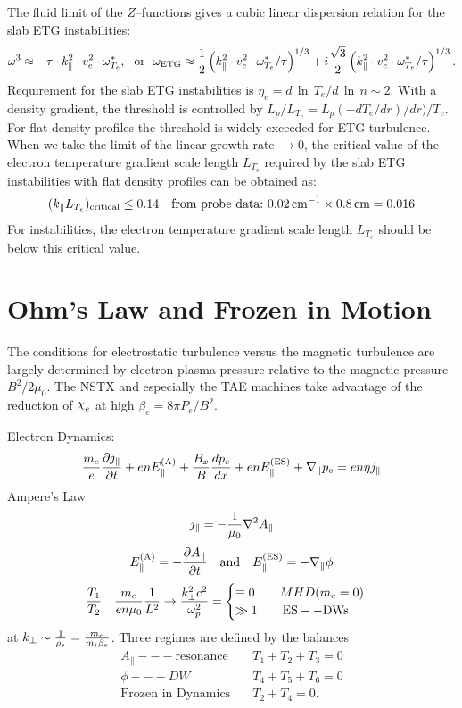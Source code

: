 \documentclass[a4paper,openany,12pt]{book}
\def\chix{\raise.5ex\hbox{$\chi$}}
\begin{document}
The fluid limit of the $Z$--functions gives a cubic linear dispersion relation for the slab ETG instabilities: 
$$\omega^3\approx-\tau\cdot k^2_\|\cdot v_e^2\cdot\omega^*_{T_e},\ \ {\rm or}\ \ \omega_{\rm ETG}\approx{1\over 2}\left(k^2_\|\cdot v^2_e\cdot\omega^*_{T_e}/\tau\right)^{1/3}+i{\sqrt 3\over 2}\left(k^2_\|\cdot v^2_e\cdot\omega^*_{T_e}/\tau\right)^{1/3}.$$
Requirement for the slab ETG instabilities is $\eta_e=d\,\ln\, T_e/d\,\ln\, n\sim 2$.
With a density gradient, the threshold is controlled by $L_p/L_{T_e}=L_p(-dT_e/dr)/dr)/T_e$.
For flat density profiles the threshold is widely exceeded for ETG turbulence.\\
 
When we take the limit of the linear growth rate $\to 0$, the critical value of the electron temperature gradient scale length $L_{T_e}$ required by the slab ETG instabilities with flat density profiles can be obtained as:  
$$(k_\| L_{T_e})_{\rm critical}\le 0.14\quad\mbox{from probe data:}\ 0.02\,\rm cm^{-1}\times 0.8\,\rm cm=0.016$$
For instabilities, the electron temperature gradient scale length $L_{T_e}$ should be below this critical value. 
%
\section{Ohm's Law and Frozen in Motion}

The conditions for electrostatic turbulence versus the magnetic turbulence are largely determined by electron plasma pressure relative to the magnetic pressure $B^2/2\mu_0$. The NSTX and especially the TAE machines take advantage of the reduction of $\chix_e$ at high $\beta_e=8\pi P_e/B^2$.

\noindent Electron Dynamics:
$${m_e\over e}{\partial j_\|\over\partial t}+enE^{\rm (A)}_\|+{B_x\over B}{dp_e\over dx}+enE_\|^{\rm (ES)}+\nabla_\|p_e=en\eta j_\|$$
Ampere's Law
$$j_\|=-{1\over\mu_0}\nabla^2 A_\|$$
$$E_\|^{\rm (A)}=-{\partial A_\|\over\partial t}\quad\mbox{and}\quad E_\|^{\rm (ES)}=-\nabla_\|\phi$$
$${T_1\over T_2}\quad{m_e\over en\mu_0}{1\over L^2}\to{k^2_\perp c^2\over\omega^2_p}=
\begin{cases} \equiv 0\qquad MHD (m_e=0)\\ \gg 1\qquad\rm ES--DWs\end{cases}$$
at $k_\perp\sim {1\over\rho_s}={m_e\over m_i\beta_e}$. Three regimes are defined by the balances
$$\begin{array}{ll}
A_\| --- \mbox{resonance} &\quad T_1+T_2+T_3=0\\
\phi --- DW &\quad T_4+T_5+T_6=0\\
\mbox{Frozen in Dynamics} &\quad T_2+T_4=0.\end{array}$$
\end{document}
